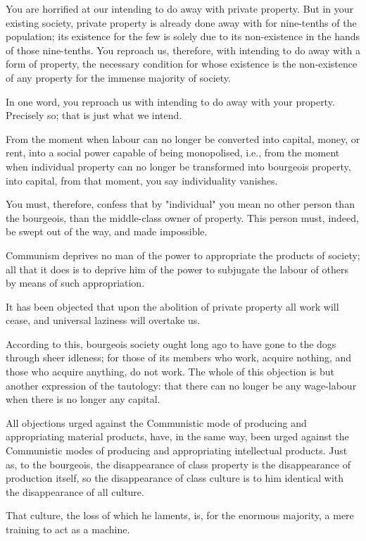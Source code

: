 \documentclass[, oneside]{article}   	%
\begin{document}
You are horrified at our intending to do away with private property. But in your existing society, private property is already done away with for nine-tenths of the population; its existence for the few is solely due to its non-existence in the hands of those nine-tenths. You reproach us, therefore, with intending to do away with a form of property, the necessary condition for whose existence is the non-existence of any property for the immense majority of society.

In one word, you reproach us with intending to do away with your property. Precisely so; that is just what we intend.

From the moment when labour can no longer be converted into capital, money, or rent, into a social power capable of being monopolised, i.e., from the moment when individual property can no longer be transformed into bourgeois property, into capital, from that moment, you say individuality vanishes.

You must, therefore, confess that by "individual" you mean no other person than the bourgeois, than the middle-class owner of property. This person must, indeed, be swept out of the way, and made impossible.

Communism deprives no man of the power to appropriate the products of society; all that it does is to deprive him of the power to subjugate the labour of others by means of such appropriation.

It has been objected that upon the abolition of private property all work will cease, and universal laziness will overtake us.

According to this, bourgeois society ought long ago to have gone to the dogs through sheer idleness; for those of its members who work, acquire nothing, and those who acquire anything, do not work. The whole of this objection is but another expression of the tautology: that there can no longer be any wage-labour when there is no longer any capital.

All objections urged against the Communistic mode of producing and appropriating material products, have, in the same way, been urged against the Communistic modes of producing and appropriating intellectual products. Just as, to the bourgeois, the disappearance of class property is the disappearance of production itself, so the disappearance of class culture is to him identical with the disappearance of all culture.

That culture, the loss of which he laments, is, for the enormous majority, a mere training to act as a machine.
\end{document}
